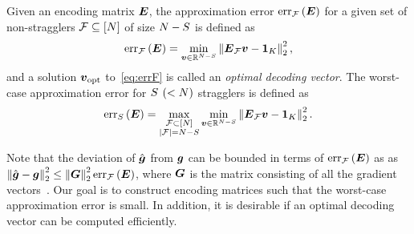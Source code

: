 \documentclass[conference,letterpaper]{IEEEtran}
\begin{document}
\begin{definition}
\label{def:decoding-error}
Given an encoding matrix $\boldsymbol{E}$, the approximation error $\mathrm{err}_{\mathcal{F}}\left(\boldsymbol{E}\right)$ for a given set of non-stragglers $\mathcal{F}\subseteq[N]$ of size $N-S$ is defined as
\begin{equation}
    \label{eq:errF}
    \mathrm{err}_{\mathcal{F}}\left(\boldsymbol{E}\right) = \min_{\boldsymbol{v}\in\mathbb{R}^{N-S}}\left\lVert\boldsymbol{E}_{\mathcal{F}}\boldsymbol{v} - \boldsymbol{1}_{K}\right\rVert_2^2,
\end{equation}
and a solution $\boldsymbol{v}_{\mathrm{opt}}$ to~\eqref{eq:errF} is called an {\it optimal decoding vector}. The worst-case approximation error for $S$ $(<N)$ stragglers is defined  as
\begin{equation}
    \label{eq:vopt}
    \mathrm{err}_{S}\left(\boldsymbol{E}\right) = \max_{\substack{\mathcal{F}\subset[N]\\ |\mathcal{F}|=N-S}}\min_{\boldsymbol{v}\in\mathbb{R}^{N-S}}\left\lVert\boldsymbol{E}_{\mathcal{F}}\boldsymbol{v} - \boldsymbol{1}_{K}\right\rVert_2^2.
\end{equation}
\end{definition}

Note that the deviation of $\hat{\boldsymbol{g}}$ from $\boldsymbol{g}$ can be bounded in terms of $\mathrm{err}_{\mathcal{F}}\left(\boldsymbol{E}\right)$ as  as $\left\lVert\hat{\boldsymbol{g}} - \boldsymbol{g}\right\rVert_2^2 \leq \left\lVert\boldsymbol{G}\right\rVert_2^2\mathrm{err}_{\mathcal{F}}\left(\boldsymbol{E}\right)$, where $\boldsymbol{G}$ is the matrix consisting of all the gradient vectors~\cite{Raviv:18}.
Our goal is to construct encoding matrices such that the worst-case approximation error is small. In addition, it is desirable if an optimal decoding vector can be computed efficiently.  %

\end{document}
